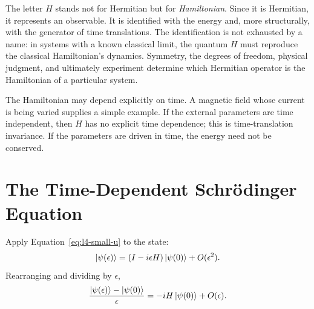 The letter \(H\) stands not for Hermitian but for \emph{Hamiltonian}. Since it is Hermitian, it represents an observable. It is identified with the energy and, more structurally, with the generator of time translations. The identification is not exhausted by a name: in systems with a known classical limit, the quantum \(H\) must reproduce the classical Hamiltonian's dynamics. Symmetry, the degrees of freedom, physical judgment, and ultimately experiment determine which Hermitian operator is the Hamiltonian of a particular system.

\begin{classroomqa}
\end{classroomqa}

The Hamiltonian may depend explicitly on time. A magnetic field whose current is being varied supplies a simple example. If the external parameters are time independent, then \(H\) has no explicit time dependence; this is time-translation invariance. If the parameters are driven in time, the energy need not be conserved.

\begin{classroomqa}
\end{classroomqa}

\section{The Time-Dependent Schr\"odinger Equation}

Apply Equation~\eqref{eq:l4-small-u} to the state:
\begin{equation}
\left\lvert\psi(\epsilon)\right\rangle=(I-i\epsilon H)\left\lvert\psi(0)\right\rangle+O(\epsilon^2).
\end{equation}
Rearranging and dividing by \(\epsilon\),
\begin{equation}
\frac{\left\lvert\psi(\epsilon)\right\rangle-\left\lvert\psi(0)\right\rangle}{\epsilon}
=-iH\left\lvert\psi(0)\right\rangle+O(\epsilon).
\label{eq:l4-difference-quotient}
\end{equation}

